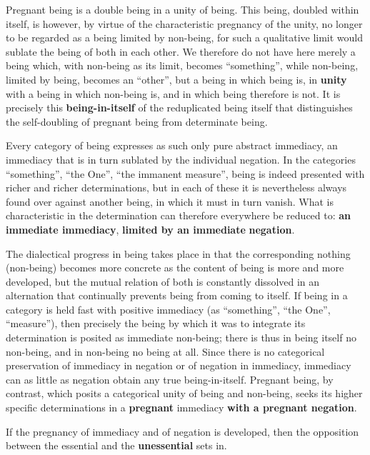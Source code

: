 \documentclass[12pt,a4paper,openany]{book}
\newcommand{\opage}[1]{\marginnote{\footnotesize\textit{[#1]}}}
\begin{document}
Pregnant being is a double being in a unity of being. This being, doubled within itself, is however, by virtue of the characteristic pregnancy of the unity, no longer to be regarded as a being limited by non-being, for such a qualitative limit would sublate the being of both in each other. We therefore do not have here merely a being which, with non-being as its limit, becomes ``something'', while non-being, limited by being, becomes an ``other'', but a being in which being is, in \textbf{unity} with a being in which non-being is, and in which being therefore is not. It is precisely this \textbf{being-in-itself} of the reduplicated being itself that distinguishes the self-doubling of pregnant being from determinate being.

Every category of being expresses as such only pure abstract immediacy, an immediacy that is in turn sublated by the individual negation. In the categories ``something'', ``the One'', ``the immanent measure'', being is indeed presented with richer and richer determinations, but in each of these it is nevertheless always found over against another being, in which it must in turn vanish. What is characteristic in the determination can therefore everywhere be reduced to: \textbf{an immediate immediacy}, \textbf{limited by an immediate} \textbf{negation}. %

The dialectical progress in being takes place in that the corresponding nothing (non-being) becomes more concrete as the content of being is more and more developed, but the mutual relation of both is constantly dissolved in an alternation that continually prevents being from coming to itself. If being in a category is held fast with positive immediacy (as ``something'', ``the One'', ``measure''), then
\setcounter{footnote}{0}%
\opage{83}precisely the being by which it was to integrate its determination is posited as immediate non-being; there is thus in being itself no non-being, and in non-being no being at all. Since there is no categorical preservation of immediacy in negation or of negation in immediacy, immediacy can as little as negation obtain any true being-in-itself. Pregnant being, by contrast, which posits a categorical unity of being and non-being, seeks its higher specific determinations in a \textbf{pregnant} immediacy \textbf{with a pregnant negation}.

If the pregnancy of immediacy and of negation is developed, then the opposition between the essential and the \textbf{unessential} sets in.
\end{document}
